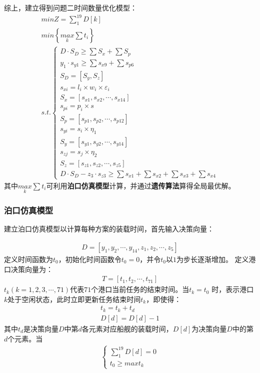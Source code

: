 \documentclass{whutmod}
\begin{document}
	
		综上，建立得到问题二时间数量优化模型：
	\begin{gather}
	min Z=\sum _{1}^{19}D[k]\\
	min \left \{ \underset{k}{max}\sum t_{i} \right \}\\
	s.t.\left\{\begin{matrix}	 D\cdot S_{D}\geq \sum  S_{x} + \sum  S_{p}
	\\ y_{1}\cdot s_{y1}\geq \sum s_{x9}+ \sum  s_{p6}
	\\S_{D}=[S_{y}, S_{z}]
	\\ s_{xi}=l_{i}\times w_{i} \times \varepsilon _{i}
	\\S_{x}=[s_{x1},s_{x2},\cdots,s_{x14}]
	\\s_{pi}=p_{i}\times s
	\\S_{p}=[s_{p1},s_{p2},\cdots,s_{p12}]
	\\     s_{yi}=s_{i}\times \eta_{1}
	\\   S_{y}=[s_{y1},s_{y2},\cdots,s_{y14}]
	\\      s_{zj}=s_{j}\times \eta_{2}
	\\ S_{z}=[s_{z1},s_{z2},\cdots,s_{z5}]
	\\	D \cdot S_{D} - z_{3} \cdot s_{z3} \geq  \sum s_{x1}+ \sum s_{x2}+\sum s_{x3}+ \sum s_{x4}
	\end{matrix}\right. 
	\end{gather}
	其中$ \underset{k}{max}\sum t_{i} $可利用\textbf{泊口仿真模型}计算，并通过\textbf{遗传算法}算得全局最优解。
	\subsubsection{泊口仿真模型}
	建立泊口仿真模型以计算每种方案的装载时间，首先输入决策向量：

		\begin{gather*}
	 D=[y_{1},y_{2},\cdots,y_{14},z_{1},z_{2},\cdots,z_{5}]
		\end{gather*}
	定义时间函数为$t_{0}$，初始化时间函数令$t_{0}=0$，并令$t_{0}$以$1$为步长逐渐增加。
	定义港口决策向量为：
		\begin{gather*}
		T=[t_{1},t_{2},\cdots,t_{71}]
		\end{gather*}
	$t_{k}(k=1,2,3,\cdots,71)$代表$71$个港口当前任务的结束时间。当$t_{k}=t_{0}$ 时，表示港口$k$处于空闲状态，此时立即更新任务结束时间$t_{k}$，即使得：
		\begin{gather*}
		t_{k}=t_{k}+t_{d}\\
		D[d]=D[d]-1
		\end{gather*}
	其中$t_{d}$是决策向量$D$中第$d$各元素对应船舰的装载时间，$D[d]$为决策向量$D$中的第$d$个元素。当
		\begin{gather*}
	\left\{\begin{matrix} \sum_{1}^{19}D[d]=0
	\\t_{0}\geqslant max t_{k} 	
	\end{matrix}\right.
		\end{gather*}
\end{document}

